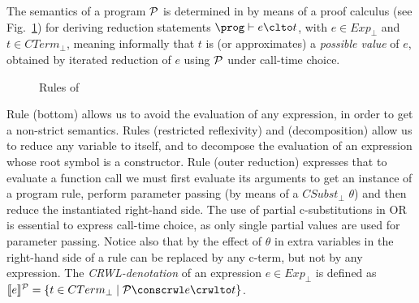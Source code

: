 \documentclass{llncs}
\newcommand{\den}[1]{[\![#1]\!]}
\begin{document}
The semantics of a program ${\cal P}$ is determined in \crwl{} by
means of a proof calculus (see Fig.~\ref{fig:crwl}) for deriving
reduction statements $\prog \vdash e \clto t$, with $e \in Exp_\perp$
and $t \in CTerm_\perp$, meaning informally that $t$ is (or
approximates) a \emph{possible value} of $e$, obtained by iterated
reduction of $e$ using ${\cal P}$ under call-time choice.
\begin{figure}[tbp]\begin{center}
\end{center}
    \caption{Rules of \crwl}
    \label{fig:crwl}
\end{figure}
Rule  (bottom) allows us to avoid the evaluation of any
expression, in order to get a non-strict semantics. Rules 
(restricted reflexivity) and  (decomposition) allow us to
reduce any variable to itself, and to decompose the evaluation of an
expression whose root symbol is a constructor. Rule  (outer
reduction) expresses that to evaluate a function call we must first
evaluate its arguments to get an instance of a program rule, perform
parameter passing (by means of a $CSubst_\perp$ $\theta$) and then
reduce the instantiated right-hand side. The use of partial
c-substitutions in {OR} is essential to express call-time choice, as
only single partial values are used for parameter passing. Notice also
that by the effect of $\theta$ in  extra variables in the
right-hand side of a rule can be replaced by any c-term, but not by
any expression.
The \emph{CRWL-denotation} of an expression $e \in Exp_\perp$ is
defined as $\den{e}^{\mathcal{P}}=\{t\in CTerm_\perp \mid \mathcal{P} \conscrwl e\crwlto t\}$.
\end{document}

